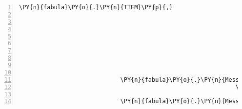 \begin{Verbatim}[commandchars=\\\{\},numbers=left,firstnumber=1,stepnumber=1]
                                                                             \PY{n}{fabula}\PY{o}{.}\PY{n}{ITEM}\PY{p}{,}
                                                                             \PY{n+nb+bp}{True}\PY{p}{,}
                                                                             \PY{n+nb+bp}{True}\PY{p}{,}
                                                                             \PY{p}{\PYZob{}}\PY{l+s}{\PYZsq{}}\PY{l+s}{image/png}\PY{l+s}{\PYZsq{}}\PY{p}{:} \PY{n}{fabula}\PY{o}{.}\PY{n}{Asset}\PY{p}{(}\PY{n}{uri}\PY{o}{=}\PY{l+s}{\PYZsq{}}\PY{l+s}{lute.png}\PY{l+s}{\PYZsq{}}\PY{p}{,}
                                                                                                        \PY{n}{data}\PY{o}{=}\PY{n+nb+bp}{None}\PY{p}{)}\PY{p}{,}
                                                                              \PY{l+s}{\PYZsq{}}\PY{l+s}{audio/ogg}\PY{l+s}{\PYZsq{}}\PY{p}{:} \PY{n}{fabula}\PY{o}{.}\PY{n}{Asset}\PY{p}{(}\PY{n}{uri}\PY{o}{=}\PY{l+s}{\PYZsq{}}\PY{l+s}{lute.ogg}\PY{l+s}{\PYZsq{}}\PY{p}{,}
                                                                                                        \PY{n}{data}\PY{o}{=}\PY{n+nb+bp}{None}\PY{p}{)}\PY{p}{,}
                                                                              \PY{l+s}{\PYZsq{}}\PY{l+s}{text/plain}\PY{l+s}{\PYZsq{}}\PY{p}{:} \PY{n}{fabula}\PY{o}{.}\PY{n}{Asset}\PY{p}{(}\PY{n}{uri}\PY{o}{=}\PY{l+s}{\PYZsq{}}\PY{l+s}{lute.txt}\PY{l+s}{\PYZsq{}}\PY{p}{,}
                                                                                                         \PY{n}{data}\PY{o}{=}\PY{n+nb+bp}{None}\PY{p}{)}\PY{p}{\PYZcb{}}\PY{p}{)}\PY{p}{,}
                                                               \PY{n}{room}\PY{o}{.}\PY{n}{entity\PYZus{}locations}\PY{p}{[}\PY{n}{ID\PYZus{}KUNI}\PY{p}{]} \PY{o}{+} \PY{p}{(}\PY{n}{room}\PY{o}{.}\PY{n}{identifier}\PY{p}{,}\PY{p}{)}\PY{p}{)}\PY{p}{]}\PY{p}{)}\PY{p}{,}
                             \PY{n}{fabula}\PY{o}{.}\PY{n}{Message}\PY{p}{(}\PY{p}{[}\PY{n}{fabula}\PY{o}{.}\PY{n}{SaysEvent}\PY{p}{(}\PY{n}{identifier}\PY{o}{=}\PY{n}{ID\PYZus{}KUNI}\PY{p}{,}
                                                              \PY{n}{text}\PY{o}{=}\PY{l+s}{\PYZsq{}}\PY{l+s}{Es hat funktioniert! Zusammen ergeben Harfensaite }\PY{l+s}{\PYZsq{}}
                                                                   \PY{l+s}{\PYZsq{}}\PY{l+s}{und kaputte Laute ein spielbares Instrument.}\PY{l+s}{\PYZsq{}}\PY{p}{)}\PY{p}{]}\PY{p}{)}\PY{p}{,}
                             \PY{n}{fabula}\PY{o}{.}\PY{n}{Message}\PY{p}{(}\PY{p}{[}\PY{n}{fabula}\PY{o}{.}\PY{n}{PicksUpEvent}\PY{p}{(}\PY{n}{identifier}\PY{o}{=}\PY{n}{ID\PYZus{}KUNI}\PY{p}{,}

\end{Verbatim}
